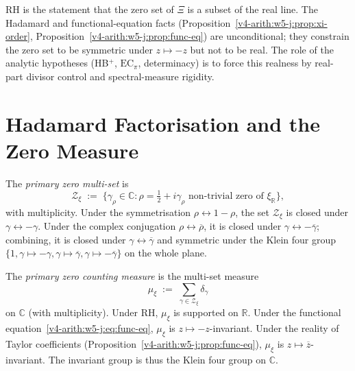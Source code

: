 \begin{remark}
\label{v4-arith:w5-j:rem:orientation}
RH is the statement that the zero set of \(\Xi\) is a subset of the
real line. The Hadamard and functional-equation facts
(Proposition~\ref{v4-arith:w5-j:prop:xi-order},
Proposition~\ref{v4-arith:w5-j:prop:func-eq}) are unconditional; they
constrain the zero set to be symmetric under \(z\mapsto-z\) but not
to be real. The role of the analytic hypotheses (HB\(^{+}\),
\(\mathrm{EC}_\pi\), determinacy) is to force this realness by real-part
divisor control and spectral-measure rigidity.
\end{remark}

\section{Hadamard Factorisation and the Zero Measure}
\label{v4-arith:w5-j:zero-measure}

\begin{definition}
\label{v4-arith:w5-j:def:primary-zero-set}
The \emph{primary zero multi-set} is
\[
\mathcal{Z}_{\xi}
\;:=\;\{\gamma_{\rho}\in\mathbb{C}:\rho=\tfrac{1}{2}+i\gamma_{\rho}\text{ non-trivial zero of }\xi_{\mathbb R}\},
\]
with multiplicity. Under the symmetrisation
\(\rho\leftrightarrow 1-\rho\), the set \(\mathcal{Z}_{\xi}\) is closed
under \(\gamma\leftrightarrow-\gamma\). Under the complex conjugation
\(\rho\leftrightarrow\overline{\rho}\), it is closed under
\(\gamma\leftrightarrow-\overline{\gamma}\); combining, it is closed
under \(\gamma\leftrightarrow\overline{\gamma}\) and symmetric under the Klein four group
\(\{1,\gamma\mapsto-\gamma,\gamma\mapsto\overline{\gamma},\gamma\mapsto-\overline{\gamma}\}\)
on the whole plane.
\end{definition}

\begin{definition}
\label{v4-arith:w5-j:def:zero-counting-measure}
The \emph{primary zero counting measure}
is the multi-set measure
\[
\mu_{\xi}\;:=\;\sum_{\gamma\in\mathcal{Z}_{\xi}}\delta_{\gamma}
\]
on \(\mathbb{C}\) (with multiplicity). Under RH, \(\mu_{\xi}\) is
supported on \(\mathbb{R}\). Under the functional
equation~\eqref{v4-arith:w5-j:eq:func-eq}, \(\mu_{\xi}\) is
\(z\mapsto-z\)-invariant. Under the reality of Taylor coefficients
(Proposition~\ref{v4-arith:w5-j:prop:func-eq}), \(\mu_{\xi}\) is
\(z\mapsto\overline{z}\)-invariant. The invariant group is thus the
Klein four group on \(\mathbb{C}\).
\end{definition}

